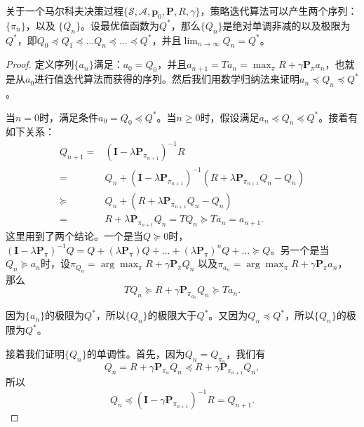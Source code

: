 \begin{lemma}
    关于一个马尔科夫决策过程$\{\mathcal{S}, \mathcal{A}, \mathbf{p}_0, \mathbf{P}, R, \gamma\}$，策略迭代算法可以产生两个序列：$\{\pi_n\}$，以及 $\{Q_n\}$。设最优值函数为$Q^*$，那么$\{Q_n\}$是绝对单调非减的以及极限为$Q^*$，即$Q_0 \preceq Q_1 \preceq \ldots Q_n \preceq \ldots \preceq Q^*$，并且$\lim_{n\rightarrow \infty} Q_n = Q^*$。
\end{lemma}
\begin{proof}
    定义序列$\{a_n\}$满足：$a_0 = Q_0$，并且$a_{n+1} = Ta_n = \max_{\pi} R + \gamma \mathbf{P}_{\pi}a_n$，也就是从$a_0$进行值迭代算法而获得的序列。然后我们用数学归纳法来证明$a_n \preceq Q_n \preceq Q^*$。

    当$n = 0$时，满足条件$a_0 = Q_0 \preceq Q^*$。当$n \ge 0$时，假设满足$a_{n} \preceq Q_{n} \preceq Q^*$。接着有如下关系：
    \begin{align*}
        Q_{n+1} =& (\mathbf{I} - \lambda \mathbf{P}_{\pi_{n+1}})^{-1}R\\
        =& Q_n + (\mathbf{I} - \lambda \mathbf{P}_{\pi_{n+1}})^{-1}
        (R + \lambda \mathbf{P}_{\pi_{n+1}}Q_n - Q_n)\\
        \succeq& Q_n + (R + \lambda \mathbf{P}_{\pi_{n+1}}Q_n - Q_n)\\
        =& R + \lambda \mathbf{P}_{\pi_{n+1}}Q_n = TQ_n 
        \succeq Ta_{n} = a_{n+1}.
    \end{align*}
    这里用到了两个结论。一个是当$Q \succeq 0$时， $(\mathbf{I} - \lambda\mathbf{P}_{\pi})^{-1}Q = Q + (\lambda\mathbf{P}_{\pi})Q + \ldots + (\lambda \mathbf{P}_{\pi})^n Q + \ldots \succeq Q$。另一个是当$Q_n \succeq a_n$时，设$\pi_{Q_n} = \arg\max_\pi R + \gamma \mathbf{P}_{\pi} Q_n$ 以及$\pi_{a_n} = \arg\max_\pi R + \gamma\mathbf{P}_{\pi} a_n$，
    那么
    \begin{equation*}
        TQ_n \succeq R + \gamma\mathbf{P}_{\pi_{a_n}} Q_n \succeq Ta_n.
    \end{equation*}


    因为$\{a_n\}$的极限为$Q^*$，所以$\{Q_n\}$的极限大于$Q^*$。又因为$Q_n \preceq Q^*$，所以$\{Q_n\}$的极限为$Q^*$。

    接着我们证明$\{Q_n\}$的单调性。首先，因为$Q_n = Q_{\pi_n}$，我们有
    \begin{equation*}
        Q_n = R + \gamma \mathbf{P}_{\pi_n} Q_n
        \preceq
        R + \gamma \mathbf{P}_{\pi_{n+1}} Q_n,
    \end{equation*}
    所以
    \begin{equation*}
        Q_n \preceq
        (\mathbf{I} - \gamma \mathbf{P}_{\pi_{n+1}})^{-1}R 
        = Q_{n+1}.
    \end{equation*}
\end{proof}

